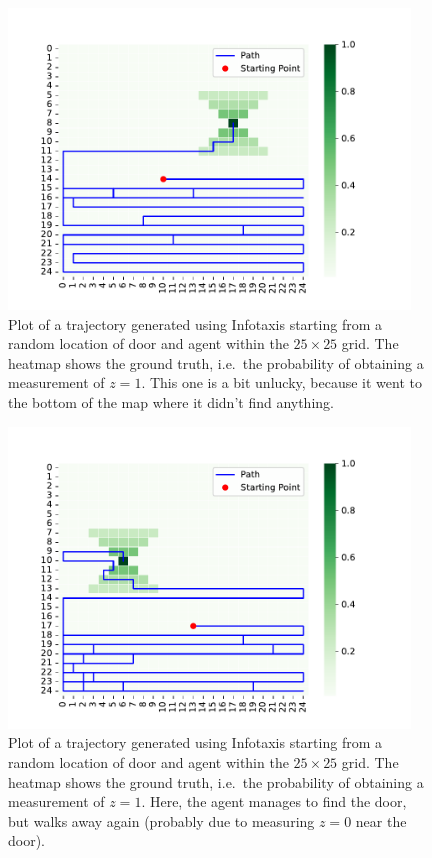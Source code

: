 \begin{figure}[h]
    \centering
    \includegraphics[width=0.95\textwidth]{path_3.pdf}
    \vspace{-5mm}
    \caption{Plot of a trajectory generated using Infotaxis starting from a random location of door and agent within the $25 \times 25$ grid.
    The heatmap shows the ground truth, i.e.~the probability of obtaining a measurement of $z=1$. 
    This one is a bit unlucky, because it went to the bottom of the map where it didn't find anything.}
    \label{fig:path3}
\end{figure}
\begin{figure}[h]
    \centering
    \includegraphics[width=0.95\textwidth]{path_4.pdf}
    \vspace{-5mm}
    \caption{Plot of a trajectory generated using Infotaxis starting from a random location of door and agent within the $25 \times 25$ grid.
    The heatmap shows the ground truth, i.e.~the probability of obtaining a measurement of $z=1$. 
    Here, the agent manages to find the door, but walks away again (probably due to measuring $z=0$ near the door).}
    \label{fig:path4}
\end{figure}
